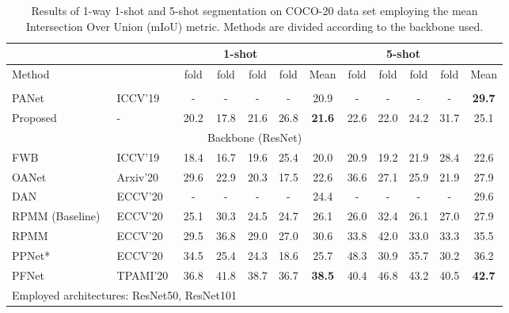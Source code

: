 \documentclass[runningheads]{llncs}
\begin{document}
\begin{table*}[h!]
\scriptsize
\begin{center}
\caption{Results of 1-way 1-shot and 5-shot segmentation on COCO-20 data set employing the mean Intersection Over Union (mIoU) metric. Methods are divided according to the backbone used.}
\label{table:headings}
\begin{tabular}{llcccccccccc}
\hline
\noalign{\smallskip}
& & \multicolumn{4}{c}{1-shot} & &\multicolumn{4}{c}{5-shot} & \\
\midrule
Method & & fold & fold & fold & fold & Mean & fold & fold & fold & fold & Mean \\
\noalign{\smallskip}
 \midrule
 \multicolumn{12}{c}{Backbone (VGG-16)} \\
 \midrule
PANet\cite{wang2019panet} & ICCV'19 & - & - & - & - &20.9 & - & - & -& - &\bf 29.7\\
Proposed& - & 20.2 & 17.8 & 21.6 & 26.8 & \bf 21.6 & 22.6 & 22.0 &24.2 & 31.7 & 25.1\\
 \midrule
 \multicolumn{12}{c}{Backbone (ResNet)} \\
 \midrule
FWB\cite{nguyen2019feature}  & ICCV'19 & 18.4 & 16.7 & 19.6 & 25.4 & 20.0 & 20.9 & 19.2 & 21.9 & 28.4 & 22.6 \\
OANet \cite{zhao2020objectness}  & Arxiv'20 & 29.6 & 22.9 & 20.3 & 17.5 & 22.6 & 36.6 & 27.1 & 25.9 & 21.9 & 27.9 \\



DAN \cite{wangfew}  & ECCV'20 & - & - & - & - &24.4 &- & - & - & - & 29.6\\
RPMM (Baseline) \cite{yang2020prototype}  & ECCV'20 & 25.1 &30.3 & 24.5 &  24.7 & 26.1 & 26.0 & 32.4 & 26.1 & 27.0 & 27.9\\
RPMM \cite{yang2020prototype}  & ECCV'20 & 29.5 & 36.8 & 29.0 & 27.0 & 30.6 & 33.8 & 42.0 & 33.0 & 33.3 &  35.5\\
PPNet* \cite{liu2020part}  & ECCV'20 & 34.5 & 25.4 & 24.3 & 18.6 & 25.7 & 48.3 & 30.9 & 35.7 & 30.2 & 36.2\\
PFNet \cite{tian2020prior}  & TPAMI'20 & 36.8& 41.8 &38.7 &36.7 &\bf38.5 &40.4 &46.8 &43.2 &40.5 &\bf42.7 \\
\hline
\multicolumn{4}{l}{\scriptsize{Employed architectures:  ResNet50,  ResNet101}}\\
\end{tabular}
\label{table:COCO}
\end{center}
\end{table*}
\end{document}
